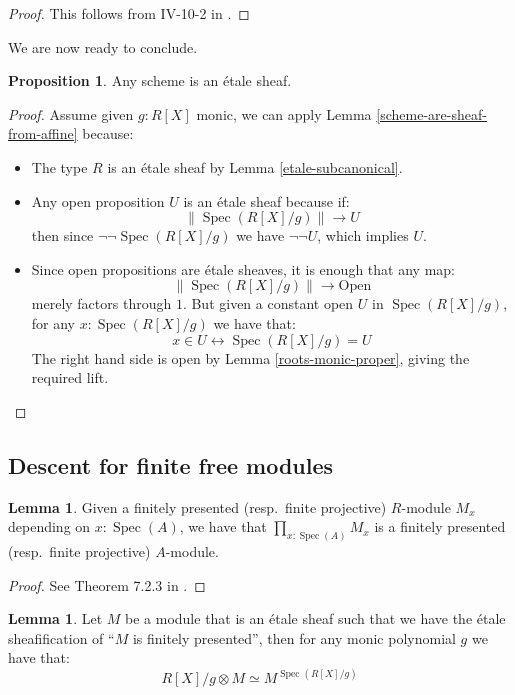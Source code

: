 \documentclass[10pt,a4paper]{article}
\theoremstyle{definition}
\newtheorem{lemma}[theorem]{Lemma}
\newtheorem{proposition}[theorem]{Proposition}
\DeclareMathOperator{\Spec}{Spec}
\newcommand{\propTrunc}[1]{\lVert #1 \rVert}
\begin{document}
\begin{proof}
  This follows from  IV-10-2 in \cite{lombardi-quitte}.
\end{proof}

We are now ready to conclude.

\begin{proposition}\label{scheme-is-etale-sheaf}
Any scheme is an \'etale sheaf.
\end{proposition}

\begin{proof}
Assume given $g:R[X]$ monic, we can apply Lemma \ref{scheme-are-sheaf-from-affine} because:
\begin{itemize}
\item The type $R$ is an \'etale sheaf by Lemma \ref{etale-subcanonical}.
\item Any open proposition $U$ is an \'etale sheaf because if:
\[\propTrunc{\Spec(R[X]/g)}\to U\]
then since $\neg\neg\Spec(R[X]/g)$ we have $\neg\neg U$, which implies $U$.
\item Since open propositions are \'etale sheaves, it is enough that any map:
\[\propTrunc{\Spec(R[X]/g)}\to \mathrm{Open}\]
merely factors through $1$. But given a constant open $U$ in $\Spec(R[X]/g)$, for any $x:\Spec(R[X]/g)$ we have that:
\[x\in U \leftrightarrow \Spec(R[X]/g) = U\]
The right hand side is open by Lemma \ref{roots-monic-proper}, giving the required lift. 
\end{itemize}
\end{proof}


\subsection{Descent for finite free modules}


\begin{lemma}\label{fp-equivalent-pointwise}
  Given a finitely presented (resp.\ finite projective)
  $R$-module $M_x$ depending on $x:\Spec(A)$, we have that $\prod_{x:\Spec(A)}M_x$ is a finitely presented (resp.\ finite projective) $A$-module.
\end{lemma}

\begin{proof}
See Theorem 7.2.3 in \cite{draft}.
\end{proof}

\begin{lemma}\label{descent-sqc-etale}
Let $M$ be a module that is an \'etale sheaf such that we have the \'etale sheafification of ``$M$ is finitely presented'', then for any monic polynomial $g$ we have that:
\[R[X]/g\otimes M \simeq M^{\Spec(R[X]/g)}\]
\end{lemma}
\end{document}
